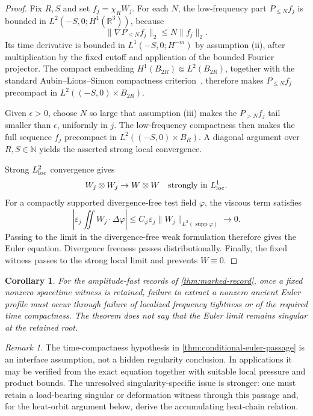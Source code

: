 \documentclass[11pt]{article}
\newtheorem{corollary}[theorem]{Corollary}
\theoremstyle{definition}\newtheorem{problem}[theorem]{Problem}
\theoremstyle{definition}
\theoremstyle{remark}
\newtheorem{remark}[theorem]{Remark}
\begin{document}
\begin{proof}
Fix \(R,S\) and set \(f_j=\chi_RW_j\).  For each \(N\), the low-frequency
part \(P_{\le N}f_j\) is bounded in
\(L^2(-S,0;H^1(\mathbb R^3))\), because
\[
 \|\nabla P_{\le N}f_j\|_2\le N\|f_j\|_2.
\]
Its time derivative is bounded in
\(L^1(-S,0;H^{-m})\) by assumption (ii), after multiplication by the fixed
cutoff and application of the bounded Fourier projector.  The compact
embedding \(H^1(B_{2R})\Subset L^2(B_{2R})\), together with the standard
Aubin--Lions--Simon compactness criterion~\cite{Simon1987}, therefore makes
\(P_{\le N}f_j\) precompact in \(L^2((-S,0)\times B_{2R})\).

Given \(\epsilon>0\), choose \(N\) so large that assumption (iii) makes
the \(P_{>N}f_j\) tail smaller than \(\epsilon\), uniformly in \(j\).
The low-frequency compactness then makes the full sequence \(f_j\)
precompact in \(L^2((-S,0)\times B_R)\).  A diagonal argument over
\(R,S\in\mathbb N\) yields the asserted strong local convergence.

Strong \(L^2_{\rm loc}\) convergence gives
\[
 W_j\otimes W_j\to W\otimes W
 \quad\text{strongly in }L^1_{\rm loc}.
\]
For a compactly supported divergence-free test field \(\varphi\), the
viscous term satisfies
\[
 \left|
 \varepsilon_j\iint W_j\cdot\Delta\varphi
 \right|
 \le
 C_\varphi\varepsilon_j
 \|W_j\|_{L^2(\operatorname{supp}\varphi)}
 \longrightarrow0.
\]
Passing to the limit in the divergence-free weak formulation therefore gives
the Euler equation.  Divergence freeness passes distributionally.  Finally,
the fixed witness passes to the strong local limit and prevents
\(W\equiv0\).
\end{proof}

\begin{corollary}\label{cor:high-critical-interface}
For the amplitude-fast records of \cref{thm:marked-record}, once a fixed
nonzero spacetime witness is retained, failure to extract a nonzero ancient
Euler profile must occur through failure of localized frequency tightness or
of the required time compactness.  The theorem does not say that the Euler
limit remains singular at the retained root.
\end{corollary}

\begin{remark}
The time-compactness hypothesis in
\cref{thm:conditional-euler-passage} is an interface assumption, not a hidden
regularity conclusion.  In applications it may be verified from the exact
equation together with suitable local pressure and product bounds.  The
unresolved singularity-specific issue is stronger: one must retain a
load-bearing singular or deformation witness through this passage and, for
the heat-orbit argument below, derive the accumulating heat-chain relation.
\end{remark}
\end{document}
